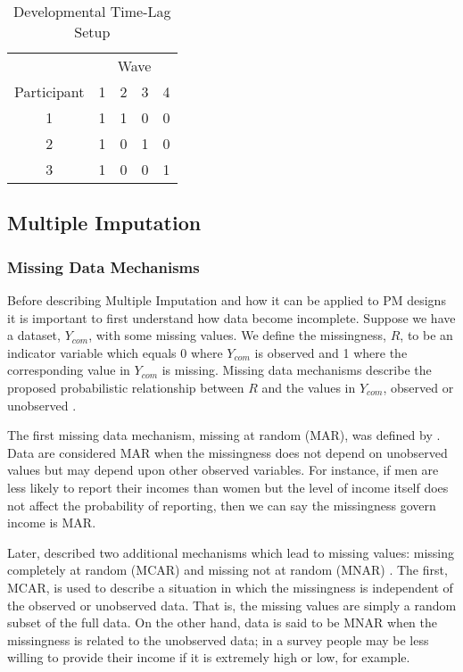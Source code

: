 \documentclass{svjour3}                     %
\begin{document}
\begin{table}[b!]
	\centering
	\caption{Developmental Time-Lag Setup}
	\label{tab:table13}
	\setlength{\tabcolsep}{0.75cm}
	\begin{tabular}{c|cccc}
		\toprule
		& \multicolumn{4}{c}{Wave} \\
		Participant & 1 & 2 & 3 & 4 \\
		\midrule
		1 & 1 & 1 & 0 & 0 \\
		2 & 1 & 0 & 1 & 0 \\
		3 & 1 & 0 & 0 & 1 \\
		\bottomrule
	\end{tabular}
\end{table}

\subsection{Multiple Imputation}
\label{sec:1.3}
\subsubsection{Missing Data Mechanisms}
\label{sec:1.3.1}
Before describing Multiple Imputation and how it can be applied to PM designs it is important to first understand how data become incomplete. Suppose we have a dataset, $Y_{com}$, with some missing values. We define the missingness, $R$, to be an indicator variable which equals 0 where $Y_{com}$ is observed and 1 where the corresponding value in $Y_{com}$ is missing. Missing data mechanisms describe the proposed probabilistic relationship between $R$ and the values in $Y_{com}$, observed or unobserved \citep{little2014statistical}. \par

The first missing data mechanism, missing at random (MAR), was defined by \citet{rubin1976inference}. Data are considered MAR when the missingness does not depend on unobserved values but may depend upon other observed variables. For instance, if men are less likely to report their incomes than women but the level of income itself does not affect the probability of reporting, then we can say the missingness govern income is MAR. \par

Later, \citet{little2014statistical} described two additional mechanisms which lead to missing values: missing completely at random (MCAR) and missing not at random (MNAR) \citep{little2014statistical}. The first, MCAR, is used to describe a situation in which the missingness is independent of the observed or unobserved data. That is, the missing values are simply a random subset of the full data. On the other hand, data is said to be MNAR when the missingness is related to the unobserved data; in a survey people may be less willing to provide their income if it is extremely high or low, for example. \par
\end{document}
